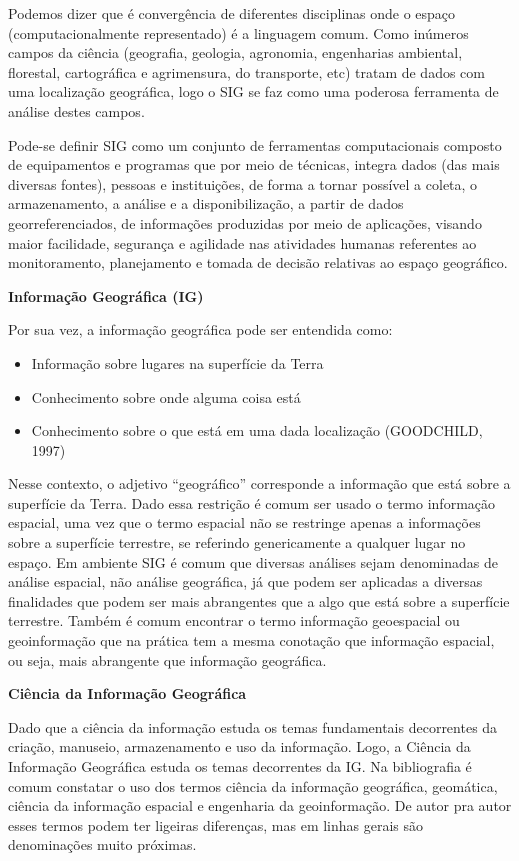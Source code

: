 \documentclass[
]{book}
\providecommand{\tightlist}{%
  \setlength{\itemsep}{0pt}\setlength{\parskip}{0pt}}
\begin{document}
Podemos dizer que é convergência de diferentes disciplinas onde o espaço (computacionalmente representado) é a linguagem comum. Como inúmeros campos da ciência (geografia, geologia, agronomia, engenharias ambiental, florestal, cartográfica e agrimensura, do transporte, etc) tratam de dados com uma localização geográfica, logo o SIG se faz como uma poderosa ferramenta de análise destes campos.

Pode-se definir SIG como um conjunto de ferramentas computacionais composto de equipamentos e programas que por meio de técnicas, integra dados (das mais diversas fontes), pessoas e instituições, de forma a tornar possível a coleta, o armazenamento, a análise e a disponibilização, a partir de dados georreferenciados, de informações produzidas por meio de aplicações, visando maior facilidade, segurança e agilidade nas atividades humanas referentes ao monitoramento, planejamento e tomada de decisão relativas ao espaço geográfico.

\textbf{Informação Geográfica (IG)}

Por sua vez, a informação geográfica pode ser entendida como:

\begin{itemize}
\tightlist
\item
  Informação sobre lugares na superfície da Terra
\item
  Conhecimento sobre onde alguma coisa está
\item
  Conhecimento sobre o que está em uma dada localização (GOODCHILD, 1997)
\end{itemize}

Nesse contexto, o adjetivo ``geográfico'' corresponde a informação que está sobre a superfície da Terra. Dado essa restrição é comum ser usado o termo informação espacial, uma vez que o termo espacial não se restringe apenas a informações sobre a superfície terrestre, se referindo genericamente a qualquer lugar no espaço. Em ambiente SIG é comum que diversas análises sejam denominadas de análise espacial, não análise geográfica, já que podem ser aplicadas a diversas finalidades que podem ser mais abrangentes que a algo que está sobre a superfície terrestre. Também é comum encontrar o termo informação geoespacial ou geoinformação que na prática tem a mesma conotação que informação espacial, ou seja, mais abrangente que informação geográfica.

\textbf{Ciência da Informação Geográfica}

Dado que a ciência da informação estuda os temas fundamentais decorrentes da criação, manuseio, armazenamento e uso da informação. Logo, a Ciência da Informação Geográfica estuda os temas decorrentes da IG.
Na bibliografia é comum constatar o uso dos termos ciência da informação geográfica, geomática, ciência da informação espacial e engenharia da geoinformação. De autor pra autor esses termos podem ter ligeiras diferenças, mas em linhas gerais são denominações muito próximas.
\end{document}
